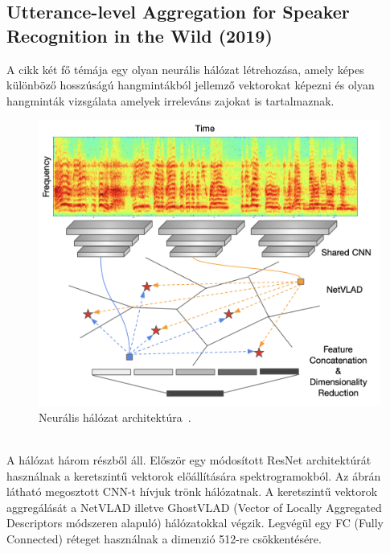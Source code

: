 \newpage

\subsection{Utterance-level Aggregation for Speaker Recognition in the Wild (2019)~\cite{speaker_in_the_wild}}

A cikk két fő témája egy olyan neurális hálózat létrehozása, amely képes különböző hosszúságú hangmintákból jellemző vektorokat képezni és olyan hangminták vizsgálata amelyek irreleváns zajokat is tartalmaznak.

\begin{figure}[!ht]
	\centering
	\includegraphics[width=150mm, keepaspectratio]{figures/frame-cnn.png}
	\caption{Neurális hálózat architektúra~\cite{speaker_in_the_wild}.}
	\label{fig:frame-cnn}
\end{figure}
\ \\
\newline
\newline
A hálózat három részből áll. Először egy módosított ResNet architektúrát használnak a keretszintű vektorok előállítására spektrogramokból. Az ábrán látható megosztott CNN-t hívjuk trönk hálózatnak. A keretszintű vektorok aggregálását a NetVLAD illetve GhostVLAD (Vector of Locally Aggregated Descriptors módszeren alapuló) hálózatokkal végzik. Legvégül egy FC (Fully Connected) réteget használnak a dimenzió 512-re csökkentésére.
\newline
\newline
